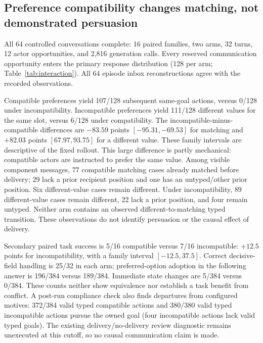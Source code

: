 \subsection{Preference compatibility changes matching, not demonstrated persuasion}

All 64 controlled conversations complete: 16 paired families, two arms, 32 turns, 12 actor opportunities, and 2,816 generation calls. Every reserved communication opportunity enters the primary response distribution (128 per arm; Table~\ref{tab:interaction}). All 64 episode inbox reconstructions agree with the recorded observations.

\begin{table}[t]\centering\small\caption{Primary controlled next-action categories per 128 allocated communication opportunities. Same-goal refers to typed slot/value matching, not semantic endorsement. Answerer-directed opportunities remain in the denominator.}\label{tab:interaction}\end{table}

Compatible preferences yield 107/128 subsequent same-goal actions, versus 0/128 under incompatibility. Incompatible preferences yield 111/128 different values for the same slot, versus 6/128 under compatibility. The incompatible-minus-compatible differences are $-83.59$ points $[-95.31,-69.53]$ for matching and $+82.03$ points $[67.97,93.75]$ for a different value. These family intervals are descriptive of the fixed rollout. This large difference is partly mechanical: compatible actors are instructed to prefer the same value. Among visible component messages, 77 compatible matching cases already matched before delivery; 29 lack a prior recipient position and one has an untyped/other prior position. Six different-value cases remain different. Under incompatibility, 89 different-value cases remain different, 22 lack a prior position, and four remain untyped. Neither arm contains an observed different-to-matching typed transition. These observations do not identify persuasion or the causal effect of delivery.

Secondary paired task success is 5/16 compatible versus 7/16 incompatible: $+12.5$ points for incompatibility, with a family interval $[-12.5,37.5]$. Correct decisive-field handling is 25/32 in each arm; preferred-option adoption in the following answer is 196/384 versus 189/384. Immediate state changes are 5/384 versus 0/384. These counts neither show equivalence nor establish a task benefit from conflict. A post-run compliance check also finds departures from configured motives: 372/384 valid typed compatible actions and 380/380 valid typed incompatible actions pursue the owned goal (four incompatible actions lack valid typed goals). The existing delivery/no-delivery review diagnostic remains unexecuted at this cutoff, so no causal communication claim is made.

